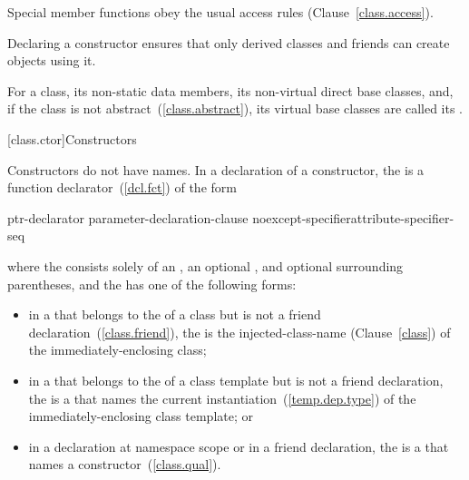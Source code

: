 \pnum
{}%
Special member functions obey the usual access rules (Clause~\ref{class.access}).
\begin{example}
Declaring a constructor
ensures that only derived classes and friends can create objects using it.
\end{example}

\pnum
For a class, its non-static data members, its non-virtual direct base classes,
and, if the class is not abstract~(\ref{class.abstract}), its virtual base
classes are called its .

[class.ctor]{Constructors}%

\pnum
Constructors do not have names.
In a declaration of a constructor, the  is a
function declarator~(\ref{dcl.fct}) of the form

\begin{ncbnf}
ptr-declarator \terminal{(} parameter-declaration-clause \terminal{)} noexcept-specifier\opt attribute-specifier-seq\opt
\end{ncbnf}

where the  consists solely of an
, an optional ,
and optional surrounding parentheses, and the  has
one of the following forms:

\begin{itemize}
\item
in a  that belongs to the
 of a class but is not a friend
declaration~(\ref{class.friend}), the  is the
injected-class-name (Clause~\ref{class}) of the immediately-enclosing class;

\item
in a  that belongs to the
 of a class template but is not a friend
declaration, the  is a  that
names the current instantiation~(\ref{temp.dep.type}) of the
immediately-enclosing class template; or

\item
in a declaration at namespace scope or in a friend declaration, the
 is a  that names a
constructor~(\ref{class.qual}).
\end{itemize}

